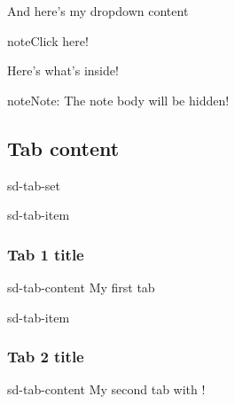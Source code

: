\documentclass[letterpaper,10pt,english]{jupyterBook}
\begin{document}
\sphinxAtStartPar
And here’s my dropdown content

\begin{sphinxadmonition}{note}{Click here!}

\sphinxAtStartPar
Here’s what’s inside!
\end{sphinxadmonition}

\begin{sphinxadmonition}{note}{Note:}
\sphinxAtStartPar
The note body will be hidden!
\end{sphinxadmonition}


\subsection{Tab content}
\label{\detokenize{docs/02_04_Mas_cosas:tab-content}}
\begin{sphinxuseclass}{sd-tab-set}
\begin{sphinxuseclass}{sd-tab-item}\subsubsection*{Tab 1 title}

\begin{sphinxuseclass}{sd-tab-content}
\sphinxAtStartPar
My first tab

\end{sphinxuseclass}
\end{sphinxuseclass}
\begin{sphinxuseclass}{sd-tab-item}\subsubsection*{Tab 2 title}

\begin{sphinxuseclass}{sd-tab-content}
\sphinxAtStartPar
My second tab with !

\end{sphinxuseclass}
\end{sphinxuseclass}
\end{sphinxuseclass}
\end{document}
